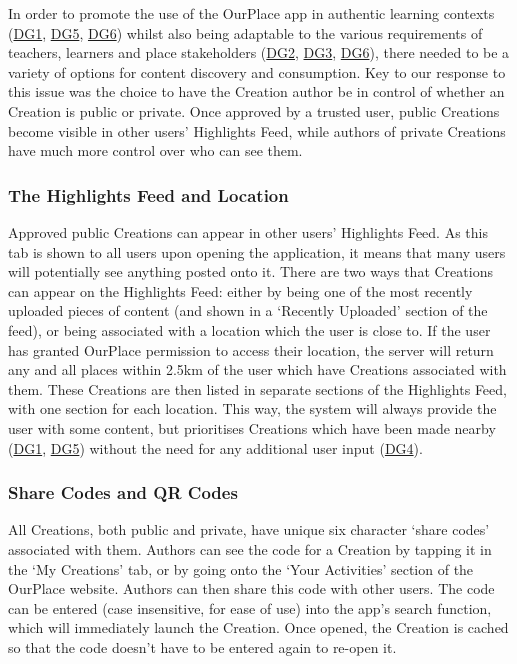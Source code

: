 In order to promote the use of the OurPlace app in authentic learning contexts (\hyperref[DG1]{DG1}, \hyperref[DG5]{DG5}, \hyperref[DG6]{DG6}) whilst also being adaptable to the various requirements of teachers, learners and place stakeholders (\hyperref[DG2]{DG2}, \hyperref[DG3]{DG3}, \hyperref[DG6]{DG6}), there needed to be a variety of options for content discovery and consumption. Key to our response to this issue was the choice to have the Creation author be in control of whether an Creation is public or private. Once approved by a trusted user, public Creations become visible in other users' Highlights Feed, while authors of private Creations have much more control over who can see them. 

\subsubsection{The Highlights Feed and Location}
Approved public Creations can appear in other users' Highlights Feed. As this tab is shown to all users upon opening the application, it means that many users will potentially see anything posted onto it. There are two ways that Creations can appear on the Highlights Feed: either by being one of the most recently uploaded pieces of content (and shown in a `Recently Uploaded' section of the feed), or being associated with a location which the user is close to. If the user has granted OurPlace permission to access their location, the server will return any and all places within 2.5km of the user which have Creations associated with them. These Creations are then listed in separate sections of the Highlights Feed, with one section for each location. This way, the system will always provide the user with some content, but prioritises Creations which have been made nearby (\hyperref[DG1]{DG1}, \hyperref[DG5]{DG5}) without the need for any additional user input (\hyperref[DG4]{DG4}).

\subsubsection{Share Codes and QR Codes}
All Creations, both public and private, have unique six character `share codes' associated with them. Authors can see the code for a Creation by tapping it in the `My Creations' tab, or by going onto the `Your Activities' section of the OurPlace website. Authors can then share this code with other users. The code can be entered (case insensitive, for ease of use) into the app's search function, which will immediately launch the Creation. Once opened, the Creation is cached so that the code doesn't have to be entered again to re-open it. 

